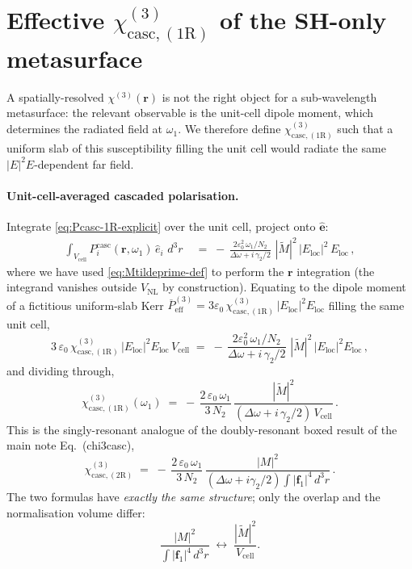 \documentclass[11pt,a4paper]{article}
\newcommand{\eps}{\varepsilon}
\newcommand{\bvec}[1]{\mathbf{#1}}
\newcommand{\f}{\bvec{f}}
\newcommand{\ri}{\bvec{r}}
\newcommand{\dthreer}{\,d^{3}r}
\newcommand{\chithree}{\chi^{(3)}}
\newcommand{\Dom}{\Delta\omega}
\newcommand{\chicascOneR}{\chi^{(3)}_{\text{casc},(1\mathrm R)}}
\newcommand{\chicascTwoR}{\chi^{(3)}_{\text{casc},(2\mathrm R)}}
\newcommand{\Vunit}{V_{\text{cell}}}
\newcommand{\VNL}{V_{\text{NL}}}
\begin{document}
\section{Effective \texorpdfstring{$\chicascOneR$}{χ³\_casc^(1R)} of the SH-only metasurface}\label{sec:chi3-1R}

A spatially-resolved $\chithree(\ri)$ is not the right object for a
sub-wavelength metasurface: the relevant observable is the unit-cell dipole
moment, which determines the radiated field at $\omega_1$.  We therefore
define $\chicascOneR$ such that a uniform slab of
this susceptibility filling the unit cell would radiate the same
$|E|^{2}E$-dependent far field.

\paragraph{Unit-cell-averaged cascaded polarisation.}
Integrate \eqref{eq:Pcasc-1R-explicit} over the unit cell, project onto
$\hat{\bm e}$:
\begin{align}
  \int_{\Vunit}\!P_i^{\text{casc}}(\ri,\omega_1)\,\hat e_i\,\dthreer
   &\;=\;
   -\,\frac{2\eps_0^{2}\,\omega_1/N_2}{\Dom+i\,\gamma_2/2}\,
      \,|\widetilde M|^{2}\,|E_\text{loc}|^{2}\,E_\text{loc}\,,
   \label{eq:Pcasc-1R-integrated}
\end{align}
where we have used \eqref{eq:Mtildeprime-def} to perform the $\ri$
integration (the integrand vanishes outside $\VNL$ by construction).
Equating to the dipole moment of a fictitious uniform-slab Kerr
$\overline P^{(3)}_\text{eff}=3\eps_0\,\chicascOneR\,
|E_\text{loc}|^{2}E_\text{loc}$
filling the same unit cell,
\begin{equation}
  3\,\eps_0\,\chicascOneR\,|E_\text{loc}|^{2}E_\text{loc}\,\Vunit
   \;=\;-\,\frac{2\eps_0^{2}\,\omega_1/N_2}{\Dom+i\,\gamma_2/2}\,
            \,|\widetilde M|^{2}\,|E_\text{loc}|^{2}E_\text{loc}\,,
\end{equation}
and dividing through,
\begin{equation}
  \boxed{\;\chicascOneR(\omega_1)
            \;=\;-\,\frac{2\,\eps_0\,\omega_1}{3\,N_2}\,
              \frac{|\widetilde M|^{2}}{(\Dom+i\,\gamma_2/2)\,\Vunit}\,.\;}
  \label{eq:chi3-1R-boxed}
\end{equation}
This is the singly-resonant analogue of the doubly-resonant boxed result
of the main note Eq.~(chi3casc),
\begin{equation*}
  \chicascTwoR\;=\;-\,\frac{2\,\eps_0\,\omega_1}{3\,N_2}\,
       \frac{|M|^{2}}{(\Dom+i\gamma_2/2)\!\int\!|\f_1|^{4}\dthreer}\,.
\end{equation*}
The two formulas have \emph{exactly the same structure}; only the overlap
and the normalisation volume differ:
\begin{equation}
  \frac{|M|^{2}}{\int|\f_1|^{4}\dthreer}
  \;\longleftrightarrow\;
  \frac{|\widetilde M|^{2}}{\Vunit}.
  \label{eq:swap-rule}
\end{equation}
\end{document}
